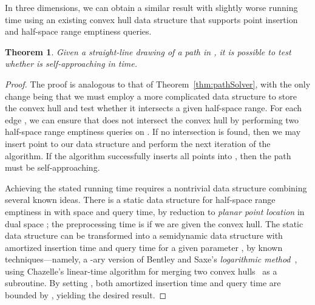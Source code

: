 \documentclass[11pt]{article}
\newtheorem{theorem}{Theorem}
\begin{document}
In three dimensions, we can obtain a similar result with slightly worse running time using an existing convex hull data structure that supports point insertion and half-space range emptiness queries.
\begin{theorem}
\label{thm:pathSolver3D}
Given a straight-line drawing of a path  in , it is possible to test whether  is self-approaching in  time.
\end{theorem}
\begin{proof}
The proof is analogous to that of Theorem~\ref{thm:pathSolver}, with the only change being that we must employ a more complicated data structure to store the convex hull and test whether it intersects a given half-space range.  For each edge , we can ensure that  does not intersect the convex hull  by performing two half-space range emptiness queries on .  If no intersection is found, then we may insert point  to our data structure and perform the next iteration of the algorithm.  If the algorithm successfully inserts all points into , then the path  must be self-approaching.

Achieving the stated running time requires a nontrivial data structure combining several known ideas.  There is a static data structure for half-space range emptiness in  with  space and  query time, by reduction to {\em planar point location\/} in dual space \cite{Kir:pl}; the preprocessing time is  if we are given the convex hull. The static data structure can be transformed into a semidynamic data structure with  amortized insertion time and  query time for a given parameter , by known techniques---namely, a -ary version of Bentley and Saxe's {\em logarithmic method\/}~\cite{BenSax}, using Chazelle's linear-time algorithm for merging two convex hulls~\cite{Cha:merge} as a subroutine. By setting , both amortized insertion time and query time are bounded by , yielding the desired result.
\end{proof}
\end{document}
